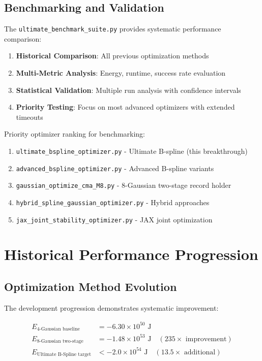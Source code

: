 \documentclass[11pt]{article}
\begin{document}
\subsection{Benchmarking and Validation}

The \texttt{ultimate\_benchmark\_suite.py} provides systematic performance comparison:

\begin{enumerate}
\item \textbf{Historical Comparison}: All previous optimization methods
\item \textbf{Multi-Metric Analysis}: Energy, runtime, success rate evaluation
\item \textbf{Statistical Validation}: Multiple run analysis with confidence intervals
\item \textbf{Priority Testing}: Focus on most advanced optimizers with extended timeouts
\end{enumerate}

Priority optimizer ranking for benchmarking:
\begin{enumerate}
\item \texttt{ultimate\_bspline\_optimizer.py} - Ultimate B-spline (this breakthrough)
\item \texttt{advanced\_bspline\_optimizer.py} - Advanced B-spline variants
\item \texttt{gaussian\_optimize\_cma\_M8.py} - 8-Gaussian two-stage record holder
\item \texttt{hybrid\_spline\_gaussian\_optimizer.py} - Hybrid approaches
\item \texttt{jax\_joint\_stability\_optimizer.py} - JAX joint optimization
\end{enumerate}

\section{Historical Performance Progression}

\subsection{Optimization Method Evolution}

The development progression demonstrates systematic improvement:

\begin{align}
E_{4\text{-Gaussian baseline}} &= -6.30 \times 10^{50} \text{ J} \\
E_{8\text{-Gaussian two-stage}} &= -1.48 \times 10^{53} \text{ J} \quad (235\times \text{ improvement}) \\
E_{\text{Ultimate B-Spline target}} &< -2.0 \times 10^{54} \text{ J} \quad (13.5\times \text{ additional})
\end{align}
\end{document}
